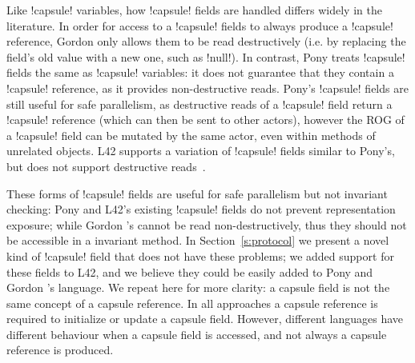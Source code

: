 Like \Q!capsule! variables, how \Q!capsule! fields are handled differs widely in the literature. In order for access to a \Q!capsule! fields to always produce a \Q!capsule! reference, Gordon \etal only allows them to be read destructively (i.e. by replacing the field's old value with a new one, such as \Q!null!). 
In contrast, Pony treats \Q!capsule! fields the same as \Q!capsule! variables: it does not guarantee that they contain a \Q!capsule! reference, as it provides non-destructive reads.
Pony's \Q!capsule! fields are still useful for safe parallelism, as destructive reads of a \Q!capsule! field return a \Q!capsule! reference (which can then be sent to other actors), however the ROG of a \Q!capsule! field can be mutated by the same actor, even within methods of unrelated objects.
L42 supports a variation of \Q!capsule! fields similar to Pony's, but does not support destructive reads~\cite{ServettoEtAl13a,GIANNINI2019145}. 

These forms of \Q!capsule! fields are useful for safe parallelism but not invariant checking: Pony and L42's existing \Q!capsule! fields do not prevent representation exposure; while Gordon \etal's cannot be read non-destructively, thus they should not be accessible in a invariant method.
In Section~\ref{s:protocol} we present a novel kind of \Q!capsule! field that does not have these problems; we added support for these fields to L42, and we believe they could be easily added to Pony and Gordon \etal's language.
We repeat here for more clarity: 
a capsule field is not the same concept of a capsule reference. In all approaches a capsule reference is required to initialize or update a capsule field.
However, different languages have different behaviour when a capsule field is accessed, and not always a capsule reference is produced.


